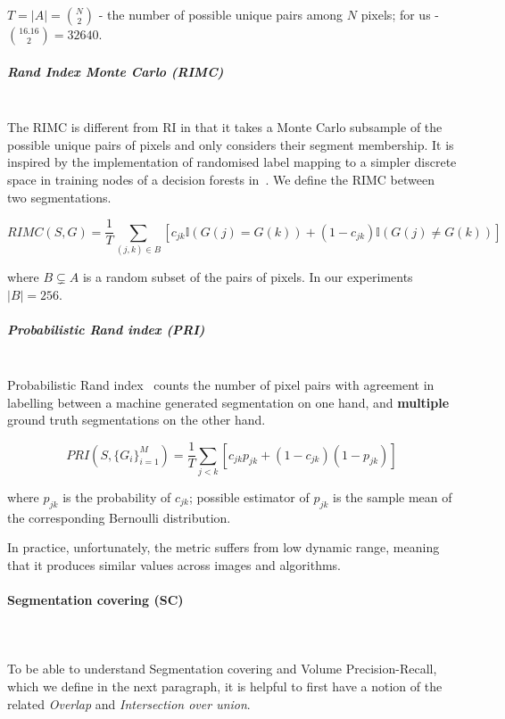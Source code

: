 $T=|A|=\binom{N}{2}$ - the number of possible unique pairs among
$N$ pixels; for us - $\binom{16 . 16}{2}=32 640$.


\subparagraph{Rand Index Monte Carlo (RIMC)}\mbox{}\\ %
\label{par:ch4-RIMC-maths}
The RIMC is different from RI in that it takes a Monte Carlo subsample of the possible unique pairs of pixels and only considers their segment membership. It is inspired by the implementation of randomised label mapping to a simpler discrete space in training nodes of a decision forests in~\cite{DollarICCV13edges}. We define the RIMC between two segmentations.

\begin{equation}
RIMC(S,G)=\frac{1}{T}\sum\limits _{(j,k)\in B}\left[c_{jk}\mathbb{I}\left(G(j)=G(k)\right)+(1-c_{jk})\mathbb{I}\left(G(j)\neq G(k)\right)\right]
\end{equation}

where $B\subsetneq A$ is a random subset of the pairs of pixels.
In our experiments $|B|=256$.


\subparagraph{Probabilistic Rand index (PRI)}\mbox{}\\
\label{par:ch4-PRI-maths}
Probabilistic Rand index~\cite{UnnikrishnanPH07} counts the number of pixel pairs with agreement in %
labelling between a machine generated segmentation on one hand, and \textbf{multiple} ground truth segmentations on the other hand.


\begin{equation}
PRI(S,\{G_{i}\}_{i=1}^{M})=\frac{1}{T}\sum\limits _{j<k}\left[c_{jk}p_{jk}+\left(1-c_{jk}\right)\left(1-p_{jk}\right)\right]
\end{equation}

where $p_{jk}$ is the probability of $c_{jk}$; possible estimator of
$p_{jk}$ is the sample mean of the corresponding Bernoulli distribution.

In practice, unfortunately, the metric suffers from low dynamic range, meaning that it produces similar values across images and algorithms.

\paragraph{Segmentation covering (SC)}\mbox{}\\\mbox{}\\
\label{par:ch4-SC-maths}
To be able to understand Segmentation covering and Volume Precision-Recall, which we define in the next paragraph, it is helpful to first have a notion of the related \textit{Overlap} and \textit{Intersection over union}.

